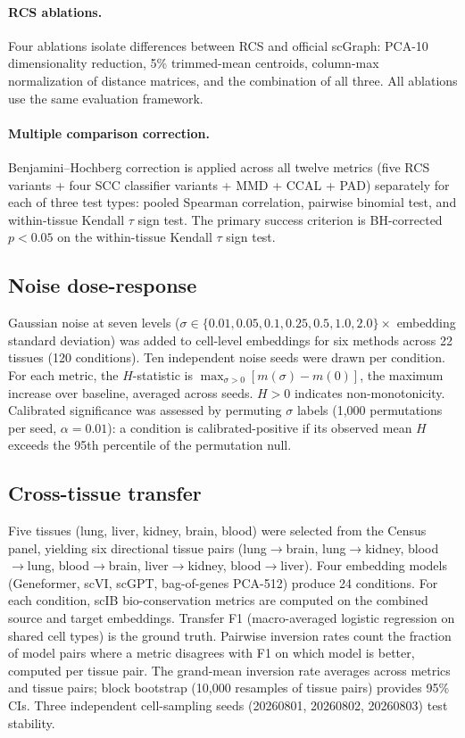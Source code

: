 \documentclass[11pt]{article}
\begin{document}
\paragraph{RCS ablations.} Four ablations isolate differences between
RCS and official scGraph: PCA-10 dimensionality reduction, 5\% trimmed-mean
centroids, column-max normalization of distance matrices, and the
combination of all three. All ablations use the same evaluation
framework.

\paragraph{Multiple comparison correction.} Benjamini--Hochberg
correction is applied across all twelve metrics (five RCS variants +
four SCC classifier variants + MMD + CCAL + PAD) separately for each of
three test types: pooled Spearman correlation, pairwise binomial test,
and within-tissue Kendall $\tau$ sign test. The primary success criterion
is BH-corrected $p < 0.05$ on the within-tissue Kendall $\tau$ sign
test.

\subsection{Noise dose-response}
\label{sec:noisemethod}

Gaussian noise at seven levels ($\sigma \in \{0.01, 0.05, 0.1, 0.25,
0.5, 1.0, 2.0\} \times$ embedding standard deviation) was added to
cell-level embeddings for six methods across 22 tissues (120
conditions). Ten independent noise seeds were drawn per condition. For
each metric, the $H$-statistic is $\max_{\sigma > 0}[m(\sigma) -
m(0)]$, the maximum increase over baseline, averaged across seeds.
$H > 0$ indicates non-monotonicity. Calibrated significance
was assessed by permuting $\sigma$ labels (1{,}000 permutations per
seed, $\alpha = 0.01$): a condition is calibrated-positive if its
observed mean $H$ exceeds the 95th percentile of the permutation null.

\subsection{Cross-tissue transfer}
\label{sec:crosstissuemethod}

Five tissues (lung, liver, kidney, brain, blood) were selected from the
Census panel, yielding six directional tissue pairs (lung$\to$brain,
lung$\to$kidney, blood$\to$lung, blood$\to$brain, liver$\to$kidney,
blood$\to$liver). Four embedding models (Geneformer, scVI, scGPT,
bag-of-genes PCA-512) produce 24 conditions. For each condition, scIB
bio-conservation metrics are computed on the combined source and target
embeddings. Transfer F1 (macro-averaged logistic regression on shared
cell types) is the ground truth. Pairwise inversion rates count the
fraction of model pairs where a metric disagrees with F1 on which model
is better, computed per tissue pair. The grand-mean inversion rate
averages across metrics and tissue pairs; block bootstrap (10,000
resamples of tissue pairs) provides 95\% CIs. Three independent
cell-sampling seeds (20260801, 20260802, 20260803) test stability.
\end{document}
